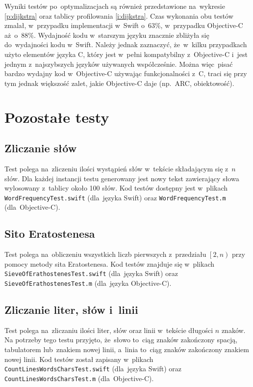 \documentclass[mgr, shortabstract]{iithesis}
\begin{document}
Wyniki testów po~optymalizacjach są również przedstawione na~wykresie \ref{p:dijkstra} oraz tablicy profilowania \ref{i:dijkstra}. Czas wykonania obu testów zmalał, w~przypadku implementacji w~Swift o~$63\%$, w~przypadku Objective-C aż~o~$88\%$. Wydajność kodu w~starszym języku znacznie zbliżyła się do~wydajności kodu w~Swift. Należy jednak zaznaczyć, że~w~kilku przypadkach użyto elementów języka C, który jest w~pełni kompatybilny z~Objective-C i~jest jednym z~najszybszych języków używanych współcześnie. Można więc~pisać bardzo wydajny kod w~Objective-C używając funkcjonalności z~C, traci się przy tym jednak większość zalet, jakie Objective-C daje (np.~ARC, obiektowość).

\section{Pozostałe testy}

\subsection{Zliczanie słów}

Test polega na~zliczeniu ilości wystąpień słów w~tekście składającym się z~$n$ słów. Dla każdej instancji testu generowany jest nowy tekst zawierający słowa wylosowany z~tablicy około 100 słów. Kod testów dostępny jest w~plikach \texttt{WordFrequencyTest.swift} (dla~języka Swift) oraz \texttt{WordFrequencyTest.m} (dla~Objective-C).

\subsection{Sito Eratostenesa}

Test polega na~obliczeniu wszystkich liczb pierwszych z~przedziału $\left[2, n\right)$ przy pomocy metody sita Eratostenesa. Kod testów znajduje się w~plikach \texttt{SieveOfErathostenesTest.swift} (dla~języka Swift) oraz \texttt{SieveOfErathostenesTest.m} (dla~języka Objective-C).

\subsection{Zliczanie liter, słów i~linii}

Test polega na~zliczaniu ilości liter, słów oraz linii w~tekście długości $n$ znaków. Na potrzeby tego testu przyjęto, że~słowo to~ciąg znaków zakończony spacją, tabulatorem lub~znakiem nowej linii, a~linia to~ciąg znaków zakończony znakiem nowej linii. Kod testów został zapisany w~plikach \texttt{CountLinesWordsCharsTest.swift} (dla~języka Swift) oraz \texttt{CountLinesWordsCharsTest.m} (dla~Objective-C).
\end{document}
